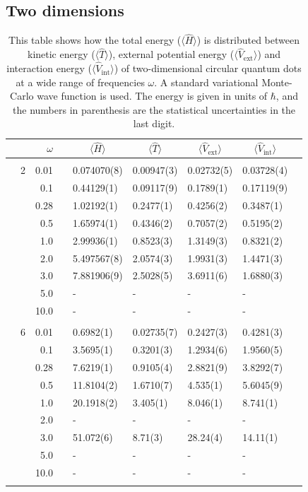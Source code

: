 \subsection{Two dimensions}
\begin{table}[h]
	\caption{This table shows how the total energy ($\langle\hat{H}\rangle$) is distributed between kinetic energy ($\langle\hat{T}\rangle$), external potential energy ($\langle\hat{V}_{\text{ext}}\rangle$) and interaction energy ($\langle\hat{V}_{\text{int}}\rangle$) of two-dimensional circular quantum dots at a wide range of frequencies $\omega$. A standard variational Monte-Carlo wave function is used. The energy is given in units of $\hbar$, and the numbers in parenthesis are the statistical uncertainties in the last digit.}
	\label{tab:splitfrequencyQDVMC}
	\begin{tabularx}{\textwidth}{R{1cm}rrcR{2.3cm}R{2.3cm}R{2.3cm}R{2.3cm}R{1cm}} \hline\hline
		&\makecell{\\ \phantom{$N$} \\ \phantom{=}} & $\omega$ &&  &  &  &  & \\ \hline \\
		&2 & 0.01 && 0.074070(8) & 0.00947(3) & 0.02732(5) & 0.03728(4) \\
		&& 0.1 && 0.44129(1) & 0.09117(9) & 0.1789(1) & 0.17119(9) \\
		&& 0.28 && 1.02192(1) & 0.2477(1) & 0.4256(2) & 0.3487(1) \\
		&& 0.5 && 1.65974(1) & 0.4346(2) & 0.7057(2) & 0.5195(2)\\
		&& 1.0 && 2.99936(1) & 0.8523(3) & 1.3149(3) & 0.8321(2)\\
		&& 2.0 && 5.497567(8) & 2.0574(3) & 1.9931(3) & 1.4471(3) \\
		&& 3.0 && 7.881906(9) & 2.5028(5) & 3.6911(6) & 1.6880(3) \\ 
		&& 5.0 && - & - & - & -\\
		&& 10.0 && - & - & - & -\\
		\hdashline \\
		
		&6 & 0.01 && 0.6982(1) & 0.02735(7) & 0.2427(3) & 0.4281(3) \\
		&& 0.1 && 3.5695(1) & 0.3201(3) & 1.2934(6) & 1.9560(5) \\
		&& 0.28 && 7.6219(1) & 0.9105(4) & 2.8821(9) & 3.8292(7) \\
		&& 0.5 && 11.8104(2) & 1.6710(7) & 4.535(1) & 5.6045(9)\\
		&& 1.0 && 20.1918(2) & 3.405(1) & 8.046(1) & 8.741(1)\\
		&& 2.0 && - & - & - & -\\
		&& 3.0 && 51.072(6) & 8.71(3) & 28.24(4) & 14.11(1) \\ 
		&& 5.0 && - & - & - & -\\
		&& 10.0 && - & - & - & -\\
		\hdashline \\
		

\end{tabularx}
\end{table}
